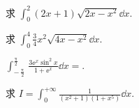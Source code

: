 	\begin{ti}
		求 $\int_{0}^{2} (2x + 1) \sqrt{2x - x^{2}} \dd{x}$.
	\end{ti}

	\begin{ti}
		求 $\int_{0}^{4} \frac{3}{4} x^{2} \sqrt{4x - x^{2}} \dd{x}$.
	\end{ti}

	\begin{ti}
		$\int_{-\frac{\uppi}{2}}^{\frac{\uppi}{2}} \frac{3 \ee^{x} \sin^{2}x}{1 + \ee^{x}} \dd{x} = $.
	\end{ti}

	\begin{ti}
		求 $I = \int_{0}^{+\infty} \frac{1}{\left( x^{2} + 1 \right) \left( 1 + x^{5} \right)} \dd{x}$.
	\end{ti}